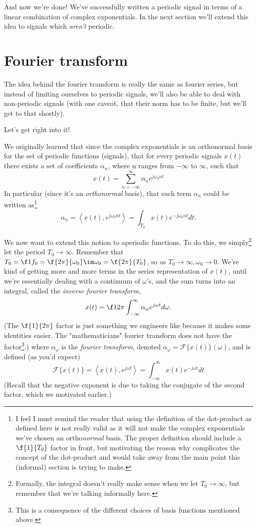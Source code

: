 \documentclass{article}
\newcommand{\0}{{\mathbf{0}}}
\newcommand{\inner}[1]{\left\langle #1 \right\rangle}
\begin{document}
And now we're done! We've successfully written a periodic signal in terms of a linear combination of complex exponentials.
In the next section we'll extend this idea to signals which \textit{aren't} periodic.

\clearpage
\section{Fourier transform}
The idea behind the fourier transform is really the same as fourier series,
but instead of limiting ourselves to periodic signals, we'll also be able to deal with
non-periodic signals (with one caveat, that their norm has to be finite,
but we'll get to that shortly).

Let's get right into it!

We originally learned that since the complex exponentials is an orthonormal basis for the set
of periodic functions (signals), that for every periodic signals $x(t)$ there exists a set of
coefficients $\alpha_n$, where n ranges from $-\infty$ to $\infty$, such that
$$ x(t) = \sum_{n=-\infty}^{\infty} \alpha_{n}e^{j\omega_0 n t} $$
In particular (since it's an \textit{orthonormal} basis), that each term $\alpha_n$ could be written as\footnote{I feel I must
remind the reader that using the definition of the dot-product as defined here is not really valid as it will not make
the complex exponentials we've chosen an ortho\textit{normal} basis. The proper
definition should include a $\f{1}{T_0}$ factor in front, but motivating the reason why complicates the concept of the dot-product and would take away from the main point this (informal) section
is trying to make.}
$$  \alpha_n = \inner{x(t), e^{j\omega_0 n t}} = \int_{T_0} x(t)e^{-j\omega_0 n t} dt. $$

We now want to extend this notion to aperiodic functions. To do this, we simply\footnote{
  Formally, the integral doesn't really make sense when we let $T_0 \to \infty$, but remember
  that we're talking informally here.
} let the period $T_0 \to \infty$. Remember that $T_0 = \f 1{f_0} = \f {2\pi}{\omega_0} \im \omega_0 = \f {2\pi}{T_0}$,
so as $T_0 \to \infty, \omega_0 \to 0$. We're kind of getting more and more terms in the
series representation of $x(t)$, until we're essentially dealing with a continuum of $\omega$'s, and
the sum turns into an integral, called the \textit{inverse fourier transform},
$$ x(t) = \f 1{2\pi} \int^{\infty}_{-\infty} \alpha_{\omega} e^{j\omega t} d\omega. $$
(The $\f{1}{2\pi}$ factor is just something we engineers like because it makes some identities easier. The "mathematicians"
fourier transform does not have the factor\footnote{This is a consequence of the different choices of basis functions mentioned above.}.)
where $\alpha_{\omega}$ is the \textit{fourier transform}, denoted $ \alpha_{\omega} = \mathscr{F}\{ x(t) \} (\omega) $,
and is defined (as you'd expect)
$$ \mathscr{F}\{ x(t) \} = \inner{x(t), e^{j\omega t}} = \int^{\infty}_{-\infty} x(t)e^{-j \omega t} dt $$
(Recall that the negative exponent is due to taking the conjugate of the second factor,
which we motivated earlier.)
\end{document}
